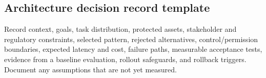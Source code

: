 \subsection{Architecture decision record template}
Record context, goals, task distribution, protected assets, stakeholder and regulatory constraints, selected pattern, rejected alternatives, control/permission boundaries, expected latency and cost, failure paths, measurable acceptance tests, evidence from a baseline evaluation, rollout safeguards, and rollback triggers. Document any assumptions that are not yet measured.

